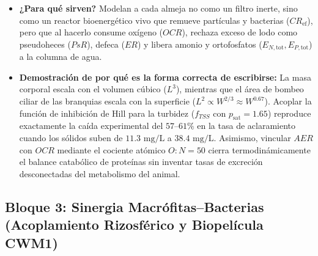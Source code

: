 \documentclass[11pt,letterpaper]{article}
\begin{document}
\begin{itemize}[leftmargin=1.5em]
    \item \textbf{¿Para qué sirven?} Modelan a cada almeja no como un filtro inerte, sino como un reactor bioenergético vivo que remueve partículas y bacterias ($CR_{\text{ef}}$), pero que al hacerlo consume oxígeno ($OCR$), rechaza exceso de lodo como pseudoheces ($PsR$), defeca ($ER$) y libera amonio y ortofosfatos ($E_{N,\text{tot}}, E_{P,\text{tot}}$) a la columna de agua.
    \item \textbf{Demostración de por qué es la forma correcta de escribirse:} La masa corporal escala con el volumen cúbico ($L^3$), mientras que el área de bombeo ciliar de las branquias escala con la superficie ($L^2 \propto W^{2/3} \approx W^{0.67}$). Acoplar la función de inhibición de Hill para la turbidez ($f_{TSS}$ con $p_{\text{sat}}=1.65$) reproduce exactamente la caída experimental del $57\text{--}61\%$ en la tasa de aclaramiento cuando los sólidos suben de $11.3\text{ mg/L}$ a $38.4\text{ mg/L}$. Asimismo, vincular $AER$ con $OCR$ mediante el cociente atómico $O:N = 50$ cierra termodinámicamente el balance catabólico de proteínas sin inventar tasas de excreción desconectadas del metabolismo del animal.
\end{itemize}

\subsection{Bloque 3: Sinergia Macrófitas--Bacterias (Acoplamiento Rizosférico y Biopelícula CWM1)}
\end{document}
